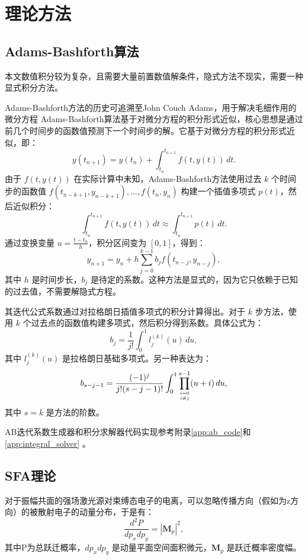 \chapter{理论方法}

\section{Adams-Bashforth算法}

本文数值积分较为复杂，且需要大量前置数值解条件，隐式方法不现实，需要一种显式积分方法。

Adams-Bashforth方法的历史可追溯至John Couch Adams，用于解决毛细作用的微分方程
Adams-Bashforth算法基于对微分方程的积分形式近似，核心思想是通过前几个时间步的函数值预测下一个时间步的解。它基于对微分方程的积分形式近似，即：
\begin{equation}
y(t_{n+1}) = y(t_n) + \int_{t_n}^{t_{n+1}} f(t, y(t)) \, dt.
\end{equation}
由于 \(f(t, y(t))\) 在实际计算中未知，Adams-Bashforth方法使用过去 \(k\) 个时间步的函数值 \(f(t_{n-k+1}, y_{n-k+1}), \ldots, f(t_n, y_n)\) 构建一个插值多项式 \(p(t)\)，然后近似积分：
\begin{equation}
\int_{t_n}^{t_{n+1}} f(t, y(t)) \, dt \approx \int_{t_n}^{t_{n+1}} p(t) \, dt.
\end{equation}
通过变换变量 \(u = \frac{t - t_n}{h}\)，积分区间变为 \([0, 1]\)，得到：
\begin{equation}
y_{n+1} = y_n + h \sum_{j=0}^{k-1} b_j f(t_{n-j}, y_{n-j}),
\end{equation}
其中 \(h\) 是时间步长，\(b_j\) 是待定的系数。这种方法是显式的，因为它只依赖于已知的过去值，不需要解隐式方程。

其迭代公式系数通过对拉格朗日插值多项式的积分计算得出。对于 \(k\) 步方法，使用 \(k\) 个过去点的函数值构建多项式，然后积分得到系数。具体公式为：
\begin{equation}
b_j = \frac{1}{j!} \int_0^1 l_j^{(k)}(u) \, du,
\end{equation}
其中 \(l_j^{(k)}(u)\) 是拉格朗日基础多项式。另一种表达为：
\begin{equation}
b_{s-j-1} = \frac{(-1)^j}{j!(s-j-1)!} \int_0^1 \prod_{i=0 \atop i \neq j}^{s-1} (u+i) \, du,
\end{equation}
其中 \(s = k\) 是方法的阶数。

AB迭代系数生成器和积分求解器代码实现参考附录\ref{app:ab_code}和\ref{app:integral_solver} 。

\section{SFA理论}
对于振幅共面的强场激光源对束缚态电子的电离，可以忽略传播方向（假如为z方向）的被散射电子的动量分布，于是有：
\begin{equation}
\frac{d^2P}{dp_x dp_y} = |\mathbf M_p|^2, \label{eq:trans amp}
\end{equation}
其中P为总跃迁概率，$dp_xdp_y$ 是动量平面空间面积微元，$\bm M_p$ 是跃迁概率密度幅。

